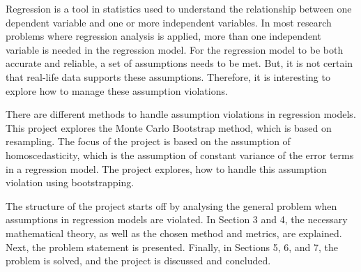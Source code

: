 
Regression is a tool in statistics used to understand the relationship between one dependent variable and one or more independent variables. In most research problems where regression analysis is applied, more than one independent variable is needed in the regression model. For the regression model to be both accurate and reliable, a set of assumptions needs to be met. But, it is not certain that real-life data supports these assumptions. Therefore, it is interesting to explore how to manage these assumption violations. \newline

\noindent There are different methods to handle assumption violations in regression models. This project explores the  Monte Carlo Bootstrap method, which is based on resampling. The focus of the project is based on the assumption of homoscedasticity, which is the assumption of constant variance of the error terms in a regression model. The project explores, how to handle this assumption violation using bootstrapping.\newline

\noindent The structure of the project starts off by analysing the general problem when assumptions in regression models are violated. In Section 3 and 4, the necessary mathematical theory, as well as the chosen method and metrics, are explained. Next, the problem statement is presented. Finally, in Sections 5, 6, and 7, the problem is solved, and the project is discussed and concluded.